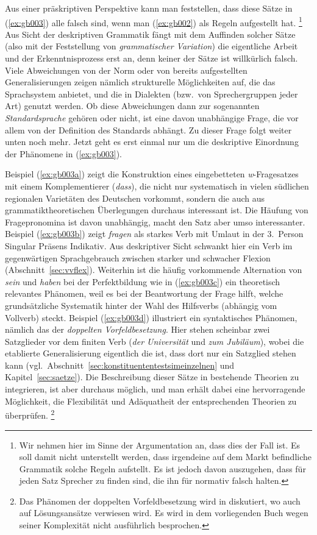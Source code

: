 Aus einer präskriptiven Perspektive kann man feststellen, dass diese Sätze in (\ref{ex:gb003}) alle falsch sind, wenn man (\ref{ex:gb002}) als Regeln aufgestellt hat.%
\footnote{Wir nehmen hier im Sinne der Argumentation an, dass dies der Fall ist.
Es soll damit nicht unterstellt werden, dass irgendeine auf dem Markt befindliche Grammatik solche Regeln aufstellt.
Es ist jedoch davon auszugehen, dass für jeden Satz Sprecher zu finden sind, die ihn für normativ falsch halten.}
Aus Sicht der deskriptiven Grammatik fängt mit dem Auffinden solcher Sätze (also mit der Feststellung von \textit{grammatischer Variation}) die eigentliche Arbeit und der Erkenntnisprozess erst an, denn keiner der Sätze ist willkürlich falsch.
Viele Abweichungen von der Norm oder von bereits aufgestellten Generalisierungen zeigen nämlich strukturelle Möglichkeiten auf, die das Sprachsystem anbietet, und die \zB in Dialekten (bzw.\ von Sprechergruppen jeder Art) genutzt werden.
Ob diese Abweichungen dann zur sogenannten \textit{Standardsprache} gehören oder nicht, ist eine davon unabhängige Frage, die vor allem von der Definition des Standards abhängt.
Zu dieser Frage folgt weiter unten noch mehr.
Jetzt geht es erst einmal nur um die deskriptive Einordnung der Phänomene in (\ref{ex:gb003}).

Beispiel (\ref{ex:gb003a}) zeigt die Konstruktion eines eingebetteten \textit{w}-Fragesatzes mit einem Komplementierer (\textit{dass}), die nicht nur systematisch in vielen südlichen regionalen Varietäten des Deutschen vorkommt, sondern die auch aus grammatiktheoretischen Überlegungen durchaus interessant ist.
Die Häufung von Fragepronomina ist davon unabhängig, macht den Satz aber umso interessanter.
Beispiel (\ref{ex:gb003b}) zeigt \textit{fragen} als starkes Verb mit Umlaut in der 3.\ Person Singular Präsens Indikativ.
Aus deskriptiver Sicht schwankt hier ein Verb im gegenwärtigen Sprachgebrauch zwischen starker und schwacher Flexion (Abschnitt~\ref{sec:vvflex}).
Weiterhin ist die häufig vorkommende Alternation von \textit{sein} und \textit{haben} bei der Perfektbildung wie in (\ref{ex:gb003c}) ein theoretisch relevantes Phänomen, weil es bei der Beantwortung der Frage hilft, welche grundsätzliche Systematik hinter der Wahl des Hilfsverbs (abhängig vom Vollverb) steckt.
Beispiel (\ref{ex:gb003d}) illustriert ein syntaktisches Phänomen, nämlich das der \textit{doppelten Vorfeldbesetzung}.
Hier stehen scheinbar zwei Satzglieder vor dem finiten Verb (\textit{der Universität} und \textit{zum Jubiläum}), wobei die etablierte Generalisierung eigentlich die ist, dass dort nur ein Satzglied stehen kann (vgl.\ Abschnitt~\ref{sec:konstituententestsimeinzelnen} und Kapitel~\ref{sec:saetze}).
Die Beschreibung dieser Sätze in bestehende Theorien zu integrieren, ist aber durchaus möglich, und man erhält dabei eine hervorragende Möglichkeit, die Flexibilität und Adäquatheit der entsprechenden Theorien zu überprüfen.%
\footnote{Das Phänomen der doppelten Vorfeldbesetzung wird in \citet{Mueller03} diskutiert, wo auch auf Lösungsansätze verwiesen wird.
Es wird in dem vorliegenden Buch wegen seiner Komplexität nicht ausführlich besprochen.}

